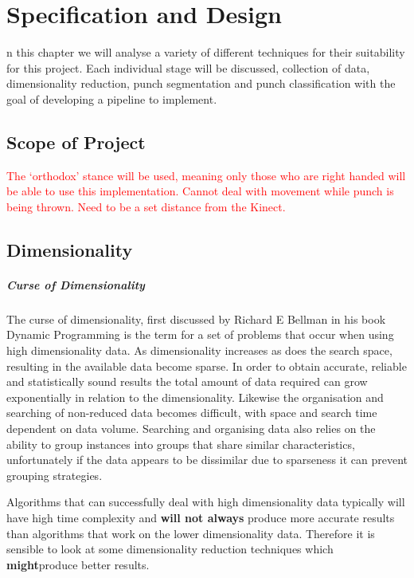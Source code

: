 %
%


\let\textcircled=\pgftextcircled
\chapter{Specification and Design}

n this chapter we will analyse a variety of different techniques for their suitability for this project. Each individual stage will be discussed, collection of data, dimensionality reduction, punch segmentation and punch classification with the goal of developing a pipeline to implement.


\section{Scope of Project}
\label{sec:sec01}
\textcolor{red}{
The `orthodox' stance will be used, meaning only those who are right handed will be able to use this implementation.
Cannot deal with movement while punch is being thrown.
Need to be a set distance from the Kinect.}

\section{Dimensionality}
\paragraph{Curse of Dimensionality}
The curse of dimensionality, first discussed by Richard E Bellman in his book Dynamic Programming\cite{dynprog} is the term for a set of problems that occur when using high dimensionality data. As dimensionality increases as does the search space, resulting in the available data become sparse. In order to obtain accurate, reliable and statistically sound results the total amount of data required can grow exponentially in relation to the dimensionality. Likewise the organisation and searching of non-reduced data becomes difficult, with space and search time dependent on data volume. Searching and organising data also relies on the ability to group instances into groups that share similar characteristics, unfortunately if the data appears to be dissimilar due to sparseness it can prevent grouping strategies.

Algorithms that can successfully deal with high dimensionality data typically will have high time complexity and {\bf will not always} produce more accurate results than algorithms that work on the lower dimensionality data. Therefore it is sensible to look at some dimensionality reduction techniques which {\bf might}produce better results.

